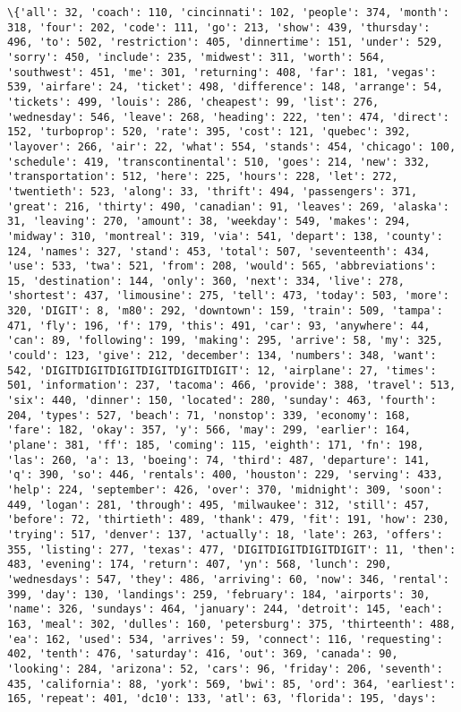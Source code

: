 \documentclass[11pt]{article}
\begin{document}
    \begin{Verbatim}[commandchars=\\\{\}]
\{'all': 32, 'coach': 110, 'cincinnati': 102, 'people': 374, 'month': 318, 'four': 202, 'code': 111, 'go': 213, 'show': 439, 'thursday': 496, 'to': 502, 'restriction': 405, 'dinnertime': 151, 'under': 529, 'sorry': 450, 'include': 235, 'midwest': 311, 'worth': 564, 'southwest': 451, 'me': 301, 'returning': 408, 'far': 181, 'vegas': 539, 'airfare': 24, 'ticket': 498, 'difference': 148, 'arrange': 54, 'tickets': 499, 'louis': 286, 'cheapest': 99, 'list': 276, 'wednesday': 546, 'leave': 268, 'heading': 222, 'ten': 474, 'direct': 152, 'turboprop': 520, 'rate': 395, 'cost': 121, 'quebec': 392, 'layover': 266, 'air': 22, 'what': 554, 'stands': 454, 'chicago': 100, 'schedule': 419, 'transcontinental': 510, 'goes': 214, 'new': 332, 'transportation': 512, 'here': 225, 'hours': 228, 'let': 272, 'twentieth': 523, 'along': 33, 'thrift': 494, 'passengers': 371, 'great': 216, 'thirty': 490, 'canadian': 91, 'leaves': 269, 'alaska': 31, 'leaving': 270, 'amount': 38, 'weekday': 549, 'makes': 294, 'midway': 310, 'montreal': 319, 'via': 541, 'depart': 138, 'county': 124, 'names': 327, 'stand': 453, 'total': 507, 'seventeenth': 434, 'use': 533, 'twa': 521, 'from': 208, 'would': 565, 'abbreviations': 15, 'destination': 144, 'only': 360, 'next': 334, 'live': 278, 'shortest': 437, 'limousine': 275, 'tell': 473, 'today': 503, 'more': 320, 'DIGIT': 8, 'm80': 292, 'downtown': 159, 'train': 509, 'tampa': 471, 'fly': 196, 'f': 179, 'this': 491, 'car': 93, 'anywhere': 44, 'can': 89, 'following': 199, 'making': 295, 'arrive': 58, 'my': 325, 'could': 123, 'give': 212, 'december': 134, 'numbers': 348, 'want': 542, 'DIGITDIGITDIGITDIGITDIGITDIGIT': 12, 'airplane': 27, 'times': 501, 'information': 237, 'tacoma': 466, 'provide': 388, 'travel': 513, 'six': 440, 'dinner': 150, 'located': 280, 'sunday': 463, 'fourth': 204, 'types': 527, 'beach': 71, 'nonstop': 339, 'economy': 168, 'fare': 182, 'okay': 357, 'y': 566, 'may': 299, 'earlier': 164, 'plane': 381, 'ff': 185, 'coming': 115, 'eighth': 171, 'fn': 198, 'las': 260, 'a': 13, 'boeing': 74, 'third': 487, 'departure': 141, 'q': 390, 'so': 446, 'rentals': 400, 'houston': 229, 'serving': 433, 'help': 224, 'september': 426, 'over': 370, 'midnight': 309, 'soon': 449, 'logan': 281, 'through': 495, 'milwaukee': 312, 'still': 457, 'before': 72, 'thirtieth': 489, 'thank': 479, 'fit': 191, 'how': 230, 'trying': 517, 'denver': 137, 'actually': 18, 'late': 263, 'offers': 355, 'listing': 277, 'texas': 477, 'DIGITDIGITDIGITDIGIT': 11, 'then': 483, 'evening': 174, 'return': 407, 'yn': 568, 'lunch': 290, 'wednesdays': 547, 'they': 486, 'arriving': 60, 'now': 346, 'rental': 399, 'day': 130, 'landings': 259, 'february': 184, 'airports': 30, 'name': 326, 'sundays': 464, 'january': 244, 'detroit': 145, 'each': 163, 'meal': 302, 'dulles': 160, 'petersburg': 375, 'thirteenth': 488, 'ea': 162, 'used': 534, 'arrives': 59, 'connect': 116, 'requesting': 402, 'tenth': 476, 'saturday': 416, 'out': 369, 'canada': 90, 'looking': 284, 'arizona': 52, 'cars': 96, 'friday': 206, 'seventh': 435, 'california': 88, 'york': 569, 'bwi': 85, 'ord': 364, 'earliest': 165, 'repeat': 401, 'dc10': 133, 'atl': 63, 'florida': 195, 'days': 
\end{Verbatim}
\end{document}
